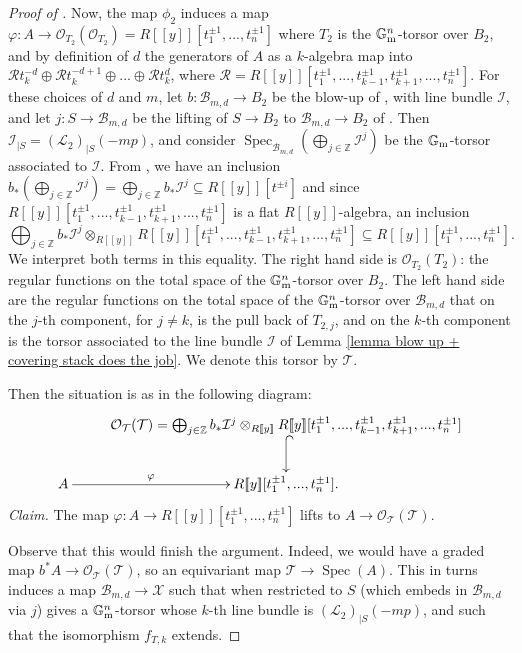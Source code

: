 \documentclass{amsart}
\newcommand{\bG}{\mathbb{G}}
\newcommand{\cB}{\mathcal{B}}
\newcommand{\cI}{\mathcal{I}}
\newcommand{\cL}{\mathcal{L}}
\newcommand{\cO}{\mathcal{O}}
\newcommand{\cR}{\mathcal{R}}
\newcommand{\cT}{\mathcal{T}}
\newcommand{\cX}{\mathcal{X}}
\newcommand{\spec}{\operatorname{Spec}}
\newcommand{\Gm}{\bG_{{\rm m}}}
\theoremstyle{definition}
\begin{document}
\begin{proof}[Proof of ]
Now, the map $\phi_2$ induces a map $\varphi: A\to \cO_{T_2}(\cO_{T_2}) = R[\![y]\!][t_1^{\pm1},...,t^{\pm1}_n]$ where $T_2$ is the $\Gm^n$-torsor over $B_2$, and by definition of $d$ the generators of $A$ as a $k$-algebra map into $\cR t^{-d}_k\oplus \cR t^{-d+1}_k\oplus ... \oplus \cR t^d_k$, where $\cR = R[\![y]\!][t_1^{\pm1},...,t_{k-1}^{\pm1},t_{k+1}^{\pm 1},...,t_n^{\pm 1}]$. For these choices of $d$ and $m$, let $b:\cB_{m,d}\to B_2$ be the blow-up of , with line bundle $\cI$,
and let $j:S\to \cB_{m,d}$ be the lifting of $S\to B_2$ to $\cB_{m,d}\to B_2$ of . Then $\cI_{|S} = (\cL_2)_{|S}(-mp)$, and consider
$\spec_{\cB_{m,d}}(\bigoplus_{j\in \mathbb{Z}}\cI^j)$ be the $\Gm$-torsor associated to $\cI$. From , we have an
inclusion $ b_*(\bigoplus_{j\in \mathbb{Z}}\cI^j) = \bigoplus_{j\in \mathbb{Z}}b_*\cI^j\subseteq R[\![y]\!][t^{\pm i}]$ and since $R[\![y]\!][t_1^{\pm1},...,t_{k-1}^{\pm1},t_{k+1}^{\pm 1},...,t_n^{\pm 1}]$ is a flat
$R[\![y]\!]$-algebra, an inclusion $$ \bigoplus_{j\in \mathbb{Z}}b_*\cI^j\otimes _{R[\![y]\!]}R[\![y]\!][t_1^{\pm1},...,t_{k-1}^{\pm1},t_{k+1}^{\pm 1},...,t_n^{\pm 1}] \subseteq R[\![y]\!][t_1^{\pm1},...,t_n^{\pm 1}]. $$
We interpret both terms in this equality. The right hand side is $\cO_{T_2}(T_2)$: the regular functions on the total space of the $\Gm^n$-torsor over $B_2$.
The left hand side are the regular functions on the total space of the $\Gm^n$-torsor over $\cB_{m,d}$ that on the $j$-th component, for $j\neq k$, is the pull back of $T_{2,j}$, and on the $k$-th component is the torsor associated to the line bundle $\cI$ of Lemma \ref{lemma blow up + covering stack does the job}. We denote this torsor by $\cT$.

Then the situation is as in the following diagram:
$$\xymatrix{ & \cO_\cT(\cT)=\bigoplus_{j\in \mathbb{Z}}b_*\cI^j\otimes _{R[\![y]\!]}R[\![y]\!][t_1^{\pm1},...,t_{k-1}^{\pm1},t_{k+1}^{\pm 1},...,t_n^{\pm 1}]  \ar@{^{(}->}[d] \\ A\ar[r]^-{\varphi} & R[\![y]\!][t_1^{\pm1},...,t_n^{\pm 1}]. }$$
\textit{Claim. } The map $\varphi:A\to R[\![y]\!][t_1^{\pm1},...,t_n^{\pm 1}]$ lifts to $A\to \cO_\cT(\cT)$.

Observe that this would finish the argument. Indeed, we would have a graded map $b^*A\to \cO_\cT(\cT)$, so an equivariant map $\cT \to \spec(A)$. This in turns induces a map $\cB_{m,d}\to \cX$ such that when restricted to $S$ (which embeds in $\cB_{m,d}$ via $j$) gives a $\Gm^n$-torsor whose $k$-th line bundle is $(\cL_2)_{|S}(-mp)$, and such that the isomorphism $f_{T,k}$ extends.


\end{proof}
\end{document}

